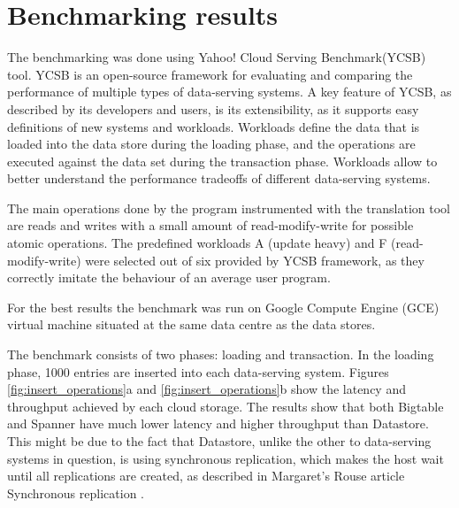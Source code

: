 \documentclass[bsc,frontabs,twoside,singlespacing,parskip,deptreport]{infthesis}     %
\begin{document}




\section{Benchmarking results}

The benchmarking was done using Yahoo! Cloud Serving Benchmark(YCSB) \citep{ycsb} tool. YCSB is an open-source framework for evaluating and comparing the performance of multiple types of data-serving systems. A key feature of YCSB, as described by its developers and users, is its extensibility, as it supports easy definitions of new systems and workloads. Workloads define the data that is loaded into the data store during the loading phase, and the operations are executed against the data set during the transaction phase. Workloads allow to better understand the performance tradeoffs of different data-serving systems.

The main operations done by the program instrumented with the translation tool are reads and writes with a small amount of read-modify-write for possible atomic operations. The predefined workloads A (update heavy) and F (read-modify-write) were selected out of six provided by YCSB framework, as they correctly imitate the behaviour of an average user program. 

For the best results the benchmark was run on Google Compute Engine (GCE) virtual machine situated at the same data centre as the data stores.

The benchmark consists of two phases: loading and transaction. In the loading phase, 1000 entries are inserted into each data-serving system. Figures \ref{fig:insert_operations}a and \ref{fig:insert_operations}b show the latency and throughput achieved by each cloud storage. The results show that both Bigtable and Spanner have much lower latency and higher throughput than Datastore. This might be due to the fact that Datastore, unlike the other to data-serving systems in question, is using synchronous replication, which makes the host wait until all replications are created, as described in Margaret's Rouse article Synchronous replication \citep{synchronous-replication}.
\end{document}

